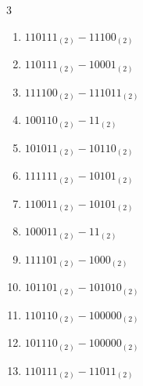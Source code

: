 \begin{multicols}{3}
\begin{enumerate}

  \item $110111_{(2)} - 11100_{(2)}$


  \item $110111_{(2)} - 10001_{(2)}$


  \item $111100_{(2)} - 111011_{(2)}$


\columnbreak %

  \item $100110_{(2)} - 11_{(2)}$


  \item $101011_{(2)} - 10110_{(2)}$


  \item $111111_{(2)} - 10101_{(2)}$


  \item $110011_{(2)} - 10101_{(2)}$


  \item $100011_{(2)} - 11_{(2)}$


  \item $111101_{(2)} - 1000_{(2)}$


  \item $101101_{(2)} - 101010_{(2)}$


  \item $110110_{(2)} - 100000_{(2)}$


  \item $101110_{(2)} - 100000_{(2)}$


  \item $110111_{(2)} - 11011_{(2)}$



\end{enumerate}
\end{multicols}
